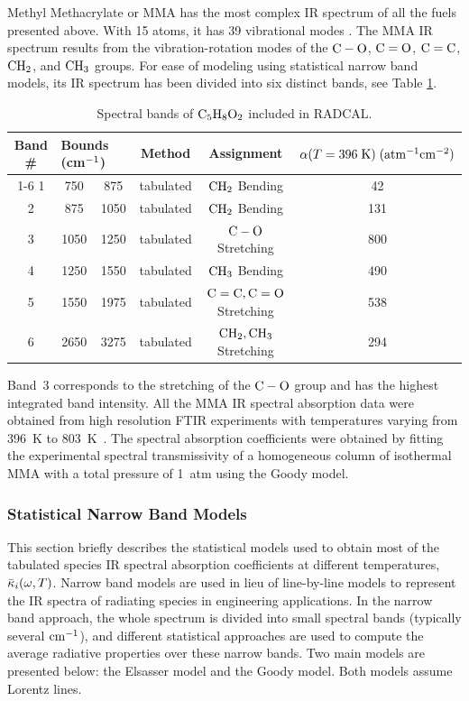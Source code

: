 Methyl Methacrylate or MMA has the most complex IR spectrum of all the fuels presented above. With 15 atoms, it has 39 vibrational modes \cite{III2011}. The MMA IR spectrum results from the vibration-rotation modes of the $\rm C-O$, $\rm C=O$, $\rm C=C$, $\rm CH_2$, and $\rm CH_3$ groups. For ease of modeling using statistical narrow band models, its IR spectrum has been divided into six distinct bands, see Table \ref{Table::C5H8O2}.
\begin{table}[ht]
   \centering
   \caption[Spectral bands of $\rm C_5H_8O_2$ included in RADCAL]{Spectral bands of $\rm C_5H_8O_2$ included in RADCAL.}
   \vspace{0.1in}
   \label{Table::C5H8O2}
    \begin{tabular}{|c|c|c|c|c|c|}
    \hline
    Band \# & \multicolumn{2}{|l|}{Bounds (cm$\rm ^{-1}$) } & Method & Assignment &  $\alpha(T=396 \; {\rm K}) \; (\rm {atm^{-1} cm^{-2}})$ \\
    \cline{1-6}
    1 & 750  & 875  & tabulated & $\rm CH_2$ Bending          & 42   \\
    2 & 875  & 1050 & tabulated & $\rm CH_2$ Bending          & 131  \\
    3 & 1050 & 1250 & tabulated & $\rm C-O$ Stretching        & 800  \\
    4 & 1250 & 1550 & tabulated & $\rm CH_3$ Bending          & 490  \\
    5 & 1550 & 1975 & tabulated & $\rm C=C, C=O$ Stretching   & 538  \\
    6 & 2650 & 3275 & tabulated & $\rm CH_2, CH_3$ Stretching & 294  \\
    \hline
   \end{tabular}
\end{table}
Band~3 corresponds to the stretching of the $\rm C-O$ group and has the highest integrated band intensity. All the MMA IR spectral absorption data were obtained from high resolution FTIR experiments with temperatures varying from 396~K to 803~K~\cite{Wakatsuki:2005}. The spectral absorption coefficients were obtained by fitting the experimental spectral transmissivity of a homogeneous column of isothermal MMA with a total pressure of 1~atm using the Goody model.

\subsubsection{Statistical Narrow Band Models}

This section briefly describes the statistical models used to obtain most of the
tabulated species IR spectral absorption coefficients at different temperatures,
$\bar{\kappa}_i(\omega,T)$. Narrow band models are used in lieu of line-by-line models to
represent the IR spectra of radiating species in engineering applications. In the narrow band approach, the whole spectrum is
divided into small spectral bands (typically several $\rm cm^{-1}$), and
different statistical approaches are used to compute the average radiative
properties over these narrow bands. Two main models are presented below: the
Elsasser model and the Goody model. Both models assume Lorentz lines.


